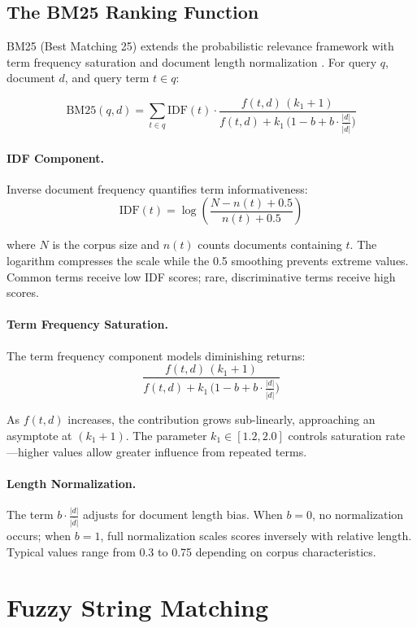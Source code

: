 \subsection{The BM25 Ranking Function}

BM25 (Best Matching 25) extends the probabilistic relevance framework with term frequency saturation and document length normalization \cite{robertson2009bm25, robertson1994okapi}. For query $q$, document $d$, and query term $t \in q$:

\[
\mathrm{BM25}(q,d) = \sum_{t \in q} \mathrm{IDF}(t) \cdot \frac{f(t,d)\,(k_1 + 1)}{f(t,d) + k_1 \,\big(1 - b + b \cdot \frac{|d|}{\overline{|d|}}\big)}
\]

\paragraph{IDF Component.} Inverse document frequency quantifies term informativeness:
\[
\mathrm{IDF}(t) = \log\left(\frac{N - n(t) + 0.5}{n(t) + 0.5}\right)
\]

where $N$ is the corpus size and $n(t)$ counts documents containing $t$. The logarithm compresses the scale while the 0.5 smoothing prevents extreme values. Common terms receive low IDF scores; rare, discriminative terms receive high scores.

\paragraph{Term Frequency Saturation.} The term frequency component models diminishing returns:
\[
\frac{f(t,d)\,(k_1 + 1)}{f(t,d) + k_1 \,\big(1 - b + b \cdot \frac{|d|}{\overline{|d|}}\big)}
\]

As $f(t,d)$ increases, the contribution grows sub-linearly, approaching an asymptote at $(k_1 + 1)$. The parameter $k_1 \in [1.2, 2.0]$ controls saturation rate—higher values allow greater influence from repeated terms.

\paragraph{Length Normalization.} The term $b \cdot \frac{|d|}{\overline{|d|}}$ adjusts for document length bias. When $b=0$, no normalization occurs; when $b=1$, full normalization scales scores inversely with relative length. Typical values range from 0.3 to 0.75 depending on corpus characteristics.

\section{Fuzzy String Matching}

